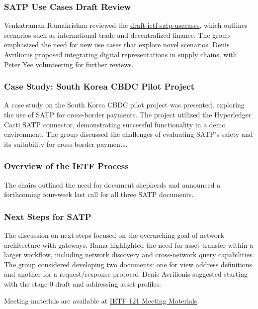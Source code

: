 \documentclass{article}
\begin{document}
\subsubsection{SATP Use Cases Draft Review}
Venkatraman Ramakrishna reviewed the \href{https://datatracker.ietf.org/doc/html/draft-ietf-satp-usecases}{draft-ietf-satp-usecases}, which outlines scenarios such as international trade and decentralized finance. The group emphasized the need for new use cases that explore novel scenarios. Denis Avrilionis proposed integrating digital representations in supply chains, with Peter Yee volunteering for further reviews.

\subsubsection{Case Study: South Korea CBDC Pilot Project}
A case study on the South Korea CBDC pilot project was presented, exploring the use of SATP for cross-border payments. The project utilized the Hyperledger Cacti SATP connector, demonstrating successful functionality in a demo environment. The group discussed the challenges of evaluating SATP's safety and its suitability for cross-border payments.

\subsubsection{Overview of the IETF Process}
The chairs outlined the need for document shepherds and announced a forthcoming four-week last call for all three SATP documents.

\subsubsection{Next Steps for SATP}
The discussion on next steps focused on the overarching goal of network architecture with gateways. Rama highlighted the need for asset transfer within a larger workflow, including network discovery and cross-network query capabilities. The group considered developing two documents: one for view address definitions and another for a request/response protocol. Denis Avrilionis suggested starting with the stage-0 draft and addressing asset profiles.

Meeting materials are available at \href{https://datatracker.ietf.org/meeting/121/materials.html}{IETF 121 Meeting Materials}.



\newpage
\end{document}
